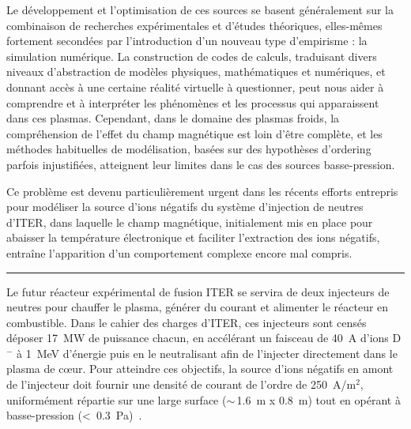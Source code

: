 \begin{refsection}
Le développement et l'optimisation de ces sources se basent généralement sur la
combinaison de recherches expérimentales et d'études théoriques, elles-mêmes
fortement secondées par l'introduction d'un nouveau type d'empirisme : la
simulation numérique.
La construction de codes de calculs, traduisant divers niveaux d'abstraction de
modèles physiques, mathématiques et numériques, et donnant accès à une
certaine réalité virtuelle à questionner, peut nous aider à
comprendre et à interpréter les phénomènes et les processus qui apparaissent dans ces
plasmas. Cependant, dans le domaine des plasmas froids, la compréhension de
l'effet du champ magnétique est loin d'être complète, et les méthodes
habituelles de modélisation, basées sur des hypothèses d'ordering parfois
injustifiées, atteignent leur limites dans le cas des sources basse-pression. 

Ce
problème est devenu particulièrement urgent dans les récents efforts entrepris pour modéliser
la source d'ions négatifs du système d'injection de neutres d'ITER, dans
laquelle le champ magnétique, initialement mis en place pour abaisser la
température électronique et faciliter l'extraction des ions négatifs, entraîne
l'apparition d'un comportement complexe encore mal compris.

\begin{center}
\rule{0.6\textwidth}{1pt}
\end{center}

Le futur réacteur expérimental de fusion ITER se servira de deux injecteurs de
neutres pour chauffer le plasma, générer du courant et alimenter le réacteur en
combustible. Dans le cahier des charges d'ITER, ces injecteurs
sont censés déposer 17~MW de puissance chacun, en accélérant un
faisceau de 40~A d'ions D$^-$ à 1~MeV d'énergie puis en le neutralisant afin de
l'injecter directement dans le plasma de c\oe ur. 
Pour atteindre ces objectifs,
la source d'ions négatifs en amont de l'injecteur doit fournir
une densité de courant de l'ordre de 250~A/m$^2$, uniformément répartie sur une
large surface ($\sim\,$1.6~m x 0.8~m) tout en opérant à
basse-pression (<~0.3~Pa)~\parencite{SimoninHDR}. 


\end{refsection}
